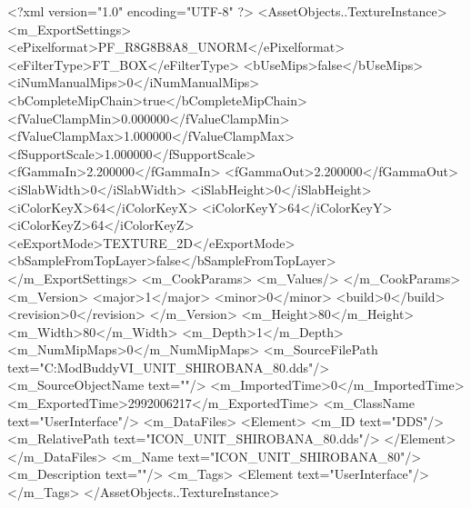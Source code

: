 <?xml version="1.0" encoding="UTF-8" ?>
<AssetObjects..TextureInstance>
	<m_ExportSettings>
		<ePixelformat>PF_R8G8B8A8_UNORM</ePixelformat>
		<eFilterType>FT_BOX</eFilterType>
		<bUseMips>false</bUseMips>
		<iNumManualMips>0</iNumManualMips>
		<bCompleteMipChain>true</bCompleteMipChain>
		<fValueClampMin>0.000000</fValueClampMin>
		<fValueClampMax>1.000000</fValueClampMax>
		<fSupportScale>1.000000</fSupportScale>
		<fGammaIn>2.200000</fGammaIn>
		<fGammaOut>2.200000</fGammaOut>
		<iSlabWidth>0</iSlabWidth>
		<iSlabHeight>0</iSlabHeight>
		<iColorKeyX>64</iColorKeyX>
		<iColorKeyY>64</iColorKeyY>
		<iColorKeyZ>64</iColorKeyZ>
		<eExportMode>TEXTURE_2D</eExportMode>
		<bSampleFromTopLayer>false</bSampleFromTopLayer>
	</m_ExportSettings>
	<m_CookParams>
		<m_Values/>
	</m_CookParams>
	<m_Version>
		<major>1</major>
		<minor>0</minor>
		<build>0</build>
		<revision>0</revision>
	</m_Version>
	<m_Height>80</m_Height>
	<m_Width>80</m_Width>
	<m_Depth>1</m_Depth>
	<m_NumMipMaps>0</m_NumMipMaps>
	<m_SourceFilePath text="C:\Users\asus\Documents\Firaxis ModBuddy\Civilization VI\temppic\ICON_UNIT_SHIROBANA_80.dds"/>
	<m_SourceObjectName text=""/>
	<m_ImportedTime>0</m_ImportedTime>
	<m_ExportedTime>2992006217</m_ExportedTime>
	<m_ClassName text="UserInterface"/>
	<m_DataFiles>
		<Element>
			<m_ID text="DDS"/>
			<m_RelativePath text="ICON_UNIT_SHIROBANA_80.dds"/>
		</Element>
	</m_DataFiles>
	<m_Name text="ICON_UNIT_SHIROBANA_80"/>
	<m_Description text=""/>
	<m_Tags>
		<Element text="UserInterface"/>
	</m_Tags>
</AssetObjects..TextureInstance>

